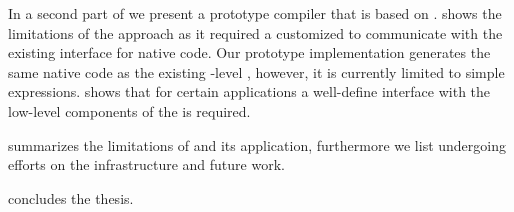 \begin{description}
	In a second part of  we present \NBJ a prototype \JIT compiler that is based on \B.
	\NBJ shows the limitations of the \B approach as it required a customized \VM to communicate with the existing \JIT interface for native code.
	Our prototype implementation generates the same native code as the existing \VM-level \JIT, however, it is currently limited to simple expressions.
	\NBJ shows that for certain applications a well-define interface with the low-level components of the \VM is required.

\item[\chapref{future}] summarizes the limitations of \B and its application, furthermore we list undergoing efforts on the \B infrastructure and future work.

\item[\chapref{conclusion}] concludes the thesis.

\end{description}


